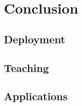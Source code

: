 \chapter*{Conclusion}

\section*{Deployment}
\todo

\section*{Teaching}
\todo

\section*{Applications}
\todo

